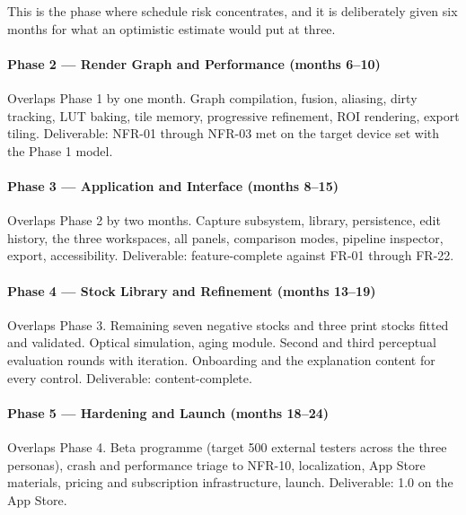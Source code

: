 This is the phase where schedule risk concentrates, and it is deliberately given
six months for what an optimistic estimate would put at three.

\paragraph{Phase 2 --- Render Graph and Performance (months 6--10)}
Overlaps Phase 1 by one month. Graph compilation, fusion, aliasing, dirty
tracking, LUT baking, tile memory, progressive refinement, ROI rendering, export
tiling. Deliverable: NFR-01 through NFR-03 met on the target device set with the
Phase 1 model.

\paragraph{Phase 3 --- Application and Interface (months 8--15)}
Overlaps Phase 2 by two months. Capture subsystem, library, persistence,
edit history, the three workspaces, all panels, comparison modes, pipeline
inspector, export, accessibility. Deliverable: feature-complete against FR-01
through FR-22.

\paragraph{Phase 4 --- Stock Library and Refinement (months 13--19)}
Overlaps Phase 3. Remaining seven negative stocks and three print stocks fitted
and validated. Optical simulation, aging module. Second and third perceptual
evaluation rounds with iteration. Onboarding and the explanation content for
every control. Deliverable: content-complete.

\paragraph{Phase 5 --- Hardening and Launch (months 18--24)}
Overlaps Phase 4. Beta programme (target 500 external testers across the three
personas), crash and performance triage to NFR-10, localization, App Store
materials, pricing and subscription infrastructure, launch. Deliverable: 1.0 on
the App Store.

